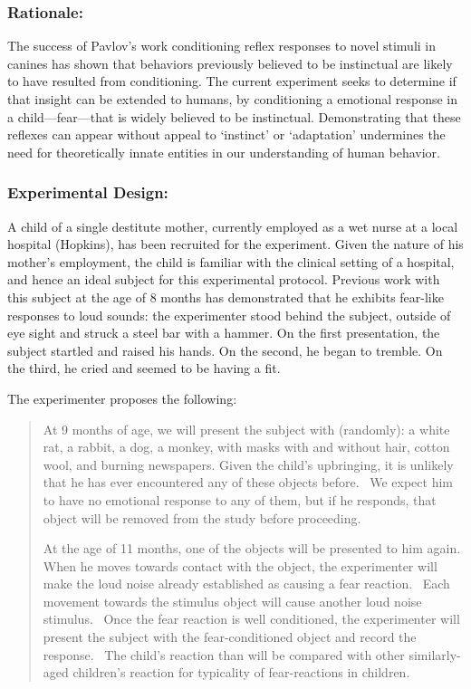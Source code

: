 \begin{refsection}
\subsubsection{Rationale:}
\label{rationale:}

The success of Pavlov's work conditioning reflex responses to novel stimuli in canines has shown that behaviors previously believed to be instinctual are likely to have resulted from conditioning. The current experiment seeks to determine if that insight can be extended to humans, by conditioning a emotional response in a child---fear---that is widely believed to be instinctual. Demonstrating that these reflexes can appear without appeal to `instinct' or `adaptation' undermines the need for theoretically innate entities in our understanding of human behavior.

\subsubsection{Experimental Design:}
\label{experimentaldesign:}

A child of a single destitute mother, currently employed as a wet nurse at a local hospital (Hopkins), has been recruited for the experiment. Given the nature of his mother's employment, the child is familiar with the clinical setting of a hospital, and hence an ideal subject for this experimental protocol. Previous work with this subject at the age of 8 months has demonstrated that he exhibits fear-like responses to loud sounds: the experimenter stood behind the subject, outside of eye sight and struck a steel bar with a hammer. On the first presentation, the subject startled and raised his hands. On the second, he began to tremble. On the third, he cried and seemed to be having a fit.

The experimenter proposes the following:

\begin{quote}

At 9 months of age, we will present the subject with (randomly): a white rat, a rabbit, a dog, a monkey, with masks with and without hair, cotton wool, and burning newspapers. Given the child's upbringing, it is unlikely that he has ever encountered any of these objects before.  We expect him to have no emotional response to any of them, but if he responds, that object will be removed from the study before proceeding.

At the age of 11 months, one of the objects will be presented to him again. When he moves towards contact with the object, the experimenter will make the loud noise already established as causing a fear reaction.  Each movement towards the stimulus object will cause another loud noise stimulus.  Once the fear reaction is well conditioned, the experimenter will present the subject with the fear-conditioned object and record the response.  The child's reaction than will be compared with other similarly-aged children's reaction for typicality of fear-reactions in children.


\end{quote}
\end{refsection}
